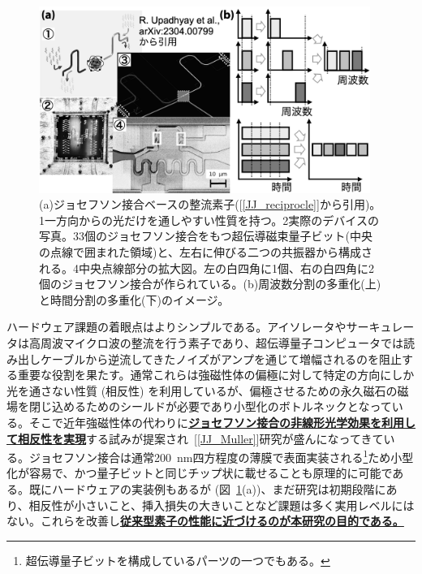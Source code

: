\documentclass[11pt,a4j,dvipdfmx]{jarticle} 					%
\newcommand{\研究課題名}{誤り耐性量子コンピュータに向けた誤り訂正技術の開発(仮)}
\newcommand{\研究機関名}{東京大学}
\newcommand{\研究代表者氏名}{寺師弘二}
\newcommand{\研究期間の最終元号年度}{10}  %
\newcommand{\mybf}[1]{{\bfseries\sffamily#1}}
\newcommand{\maruone}{\raise0.2mm\hbox{\textcircled{\scriptsize{1}}}}
\newcommand{\marutwo}{\raise0.2mm\hbox{\textcircled{\scriptsize{2}}}}
\newcommand{\maruthree}{\raise0.2mm\hbox{\textcircled{\scriptsize{3}}}}
\newcommand{\marufour}{\raise0.2mm\hbox{\textcircled{\scriptsize{4}}}}
\begin{document}
\begin{figure}
	\begin{center}
		\vspace{-1cm}
		\includegraphics[width=10.8cm]{figs/hard.png}\vspace{-0.4cm}
		\caption{\small{(a)ジョセフソン接合ベースの整流素子([\ref{JJ_reciprocle}]から引用)。\maruone 一方向からの光だけを通しやすい性質を持つ。\marutwo 実際のデバイスの写真。\maruthree 3個のジョセフソン接合をもつ超伝導磁束量子ビット(中央の点線で囲まれた領域)と、左右に伸びる二つの共振器から構成される。\marufour 中央点線部分の拡大図。左の白四角に1個、右の白四角に2個のジョセフソン接合が作られている。(b)周波数分割の多重化(上)と時間分割の多重化(下)のイメージ。}
		\label{fig:hard}}\vspace{-0.7cm}
	\end{center}
\end{figure}

ハードウェア課題の着眼点はよりシンプルである。アイソレータやサーキュレータは高周波マイクロ波の整流を行う素子であり、超伝導量子コンピュータでは読み出しケーブルから逆流してきたノイズがアンプを通じて増幅されるのを阻止する重要な役割を果たす。通常これらは強磁性体の偏極に対して特定の方向にしか光を通さない性質 (相反性) を利用しているが、偏極させるための永久磁石の磁場を閉じ込めるためのシールドが必要であり小型化のボトルネックとなっている。そこで近年強磁性体の代わりに\mybf{\ul{ジョセフソン接合の非線形光学効果を利用して相反性を実現}}する試みが提案され~[\ref{JJ_Muller}]研究が盛んになってきている。ジョセフソン接合は通常200~{nm}四方程度の薄膜で表面実装される\footnote{超伝導量子ビットを構成しているパーツの一つでもある。}ため小型化が容易で、かつ量子ビットと同じチップ状に載せることも原理的に可能である。既にハードウェアの実装例もあるが (図~\ref{fig:hard}(a))、まだ研究は初期段階にあり、相反性が小さいこと、挿入損失の大きいことなど課題は多く実用レベルにはない。これらを改善し\mybf{\ul{従来型素子の性能に近づけるのが本研究の目的である。}}
\end{document}
